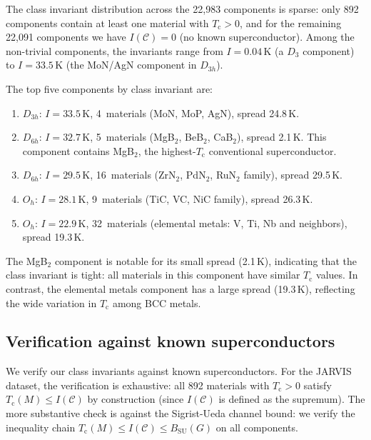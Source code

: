 \documentclass[12pt,a4paper]{article}
\theoremstyle{plain}
\theoremstyle{definition}
\theoremstyle{remark}
\newcommand{\Tc}{T_{\mathrm{c}}}
\begin{document}
The class invariant distribution across the 22{,}983 components is
sparse: only 892 components contain at least one material with $\Tc > 0$,
and for the remaining 22{,}091 components we have $I(\mathcal{C}) = 0$
(no known superconductor).  Among the non-trivial components, the
invariants range from $I = 0.04$\,K (a $D_3$ component) to $I = 33.5$\,K
(the MoN/AgN component in $D_{3h}$).

The top five components by class invariant are:
\begin{enumerate}
  \item $D_{3h}$: $I = 33.5$\,K, 4~materials (MoN, MoP, AgN), spread
    24.8\,K.
  \item $D_{6h}$: $I = 32.7$\,K, 5~materials (MgB$_2$, BeB$_2$, CaB$_2$),
    spread 2.1\,K.  This component contains MgB$_2$, the highest-$\Tc$
    conventional superconductor.
  \item $D_{6h}$: $I = 29.5$\,K, 16~materials (ZrN$_2$, PdN$_2$, RuN$_2$
    family), spread 29.5\,K.
  \item $O_h$: $I = 28.1$\,K, 9~materials (TiC, VC, NiC family), spread
    26.3\,K.
  \item $O_h$: $I = 22.9$\,K, 32~materials (elemental metals: V, Ti, Nb
    and neighbors), spread 19.3\,K.
\end{enumerate}
The MgB$_2$ component is notable for its small spread (2.1\,K), indicating
that the class invariant is tight: all materials in this component have
similar $\Tc$ values.  In contrast, the elemental metals component has a
large spread (19.3\,K), reflecting the wide variation in $\Tc$ among BCC
metals.

\subsection{Verification against known superconductors}

We verify our class invariants against known superconductors.  For the
JARVIS dataset, the verification is exhaustive: all 892 materials with
$\Tc > 0$ satisfy $\Tc(M) \leq I(\mathcal{C})$ by construction (since
$I(\mathcal{C})$ is defined as the supremum).  The more substantive
check is against the Sigrist-Ueda channel bound: we verify the inequality
chain $\Tc(M) \leq I(\mathcal{C}) \leq B_{\mathrm{SU}}(G)$ on all
components.
\end{document}
